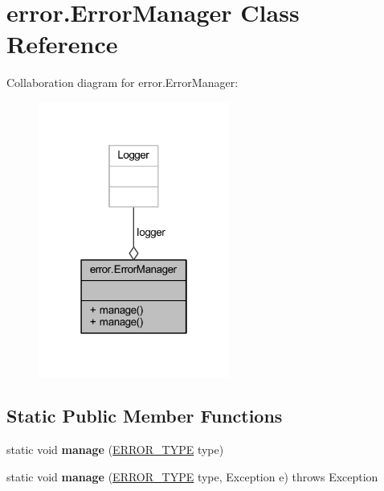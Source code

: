 \hypertarget{classerror_1_1_error_manager}{\section{error.\-Error\-Manager Class Reference}
\label{classerror_1_1_error_manager}
}


Collaboration diagram for error.\-Error\-Manager\-:\nopagebreak
\begin{figure}[H]
\begin{center}
\leavevmode
\includegraphics[width=178pt]{classerror_1_1_error_manager__coll__graph}
\end{center}
\end{figure}
\subsection*{Static Public Member Functions}
\begin{DoxyCompactItemize}
\item 
\hypertarget{classerror_1_1_error_manager_a22faa52ee5734184fa446591fd45ba7f}{static void {\bfseries manage} (\hyperlink{enumerror_1_1_e_r_r_o_r___t_y_p_e}{E\-R\-R\-O\-R\-\_\-\-T\-Y\-P\-E} type)}\label{classerror_1_1_error_manager_a22faa52ee5734184fa446591fd45ba7f}

\item 
\hypertarget{classerror_1_1_error_manager_aa17e91fab94fd42d865e53eaec80e2cb}{static void {\bfseries manage} (\hyperlink{enumerror_1_1_e_r_r_o_r___t_y_p_e}{E\-R\-R\-O\-R\-\_\-\-T\-Y\-P\-E} type, Exception e)  throws Exception}\label{classerror_1_1_error_manager_aa17e91fab94fd42d865e53eaec80e2cb}

\end{DoxyCompactItemize}
